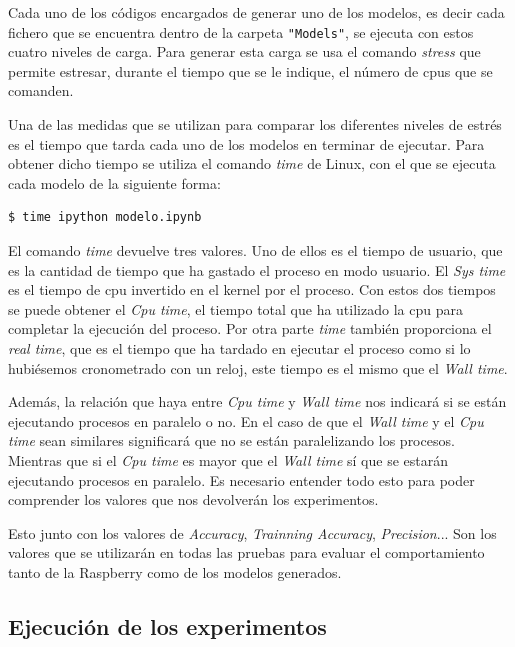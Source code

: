 \documentclass[a4paper, 12pt]{book}
\begin{document}
Cada uno de los códigos encargados de generar uno de los modelos, es decir cada fichero que se encuentra dentro de la carpeta \texttt{"Models"}, se ejecuta con estos cuatro niveles de carga. Para generar esta carga se usa el comando \textit{stress} que permite estresar, durante el tiempo que se le indique, el número de cpus que se comanden. 

Una de las medidas que se utilizan para comparar los diferentes niveles de estrés es el tiempo que tarda cada uno de los modelos en terminar de ejecutar. Para obtener dicho tiempo se utiliza el comando \textit{time} de Linux, con el que se ejecuta cada modelo de la siguiente forma:\\

\begin{lstlisting}[language=bash]
  $ time ipython modelo.ipynb
\end{lstlisting}

El comando \textit{time} devuelve tres valores. Uno de ellos es el tiempo de usuario, que es la cantidad de tiempo que ha gastado el proceso en modo usuario. El \textit{Sys time} es el tiempo de cpu invertido en el kernel por el proceso. Con estos dos tiempos se puede obtener el \textit{Cpu time}, el tiempo total que ha utilizado la cpu para completar la ejecución del proceso. Por otra parte \textit{time} también proporciona el \textit{real time}, que es el tiempo que ha tardado en ejecutar el proceso como si lo hubiésemos cronometrado con un reloj, este tiempo es el mismo que el \textit{Wall time}. 

Además, la relación que haya entre \textit{Cpu time} y \textit{Wall time} nos indicará si se están ejecutando procesos en paralelo o no. En el caso de que el \textit{Wall time} y el \textit{Cpu time} sean similares significará que no se están paralelizando los procesos. Mientras que si el \textit{Cpu time} es mayor que el \textit{Wall time} sí que se estarán ejecutando procesos en paralelo\cite{timeDoc}. Es necesario entender todo esto para poder comprender los valores que nos devolverán los experimentos.

Esto junto con los valores de \textit{Accuracy}, \textit{Trainning Accuracy}, \textit{Precision}... Son los valores que se utilizarán en todas las pruebas para evaluar el comportamiento tanto de la Raspberry como de los modelos generados.

\subsection{Ejecución de los experimentos}
\label{subsec:ejecucion_experimentos}
\end{document}
